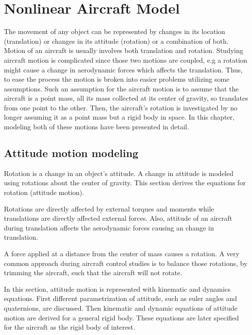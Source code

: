 \chapter{Nonlinear Aircraft Model}

The movement of any object can be represented by changes in its location (translation) or changes in its attitude (rotation) or a combination of both. 
Motion of an aircraft is usually involves both translation and rotation. 
Studying aircraft motion is complicated since those two motions are coupled, e.g a rotation might cause a change in aerodynamic forces which affects the translation. 
Thus, to ease the process the motion is broken into easier problems utilizing some assumptions. 
Such an assumption for the aircraft motion is to assume that the aircraft is a point mass, all its mass collected at its center of gravity, so translates from one point to the other. 
Then, the aircraft's rotation is investigated by no longer assuming it as a point mass but a rigid body in space.
In this chapter, modeling both of these motions have been presented in detail.
  
\section{Attitude motion modeling}

Rotation is a change in an object's attitude. 
A change in attitude is modeled using rotations about the center of gravity.  
This section derives the equations for rotation (attitude motion).

Rotations are directly affected by external torques and moments while translations are directly affected external forces. 
Also, attitude of an aircraft during translation affects the aerodynamic forces causing an change in translation.

A force applied at a distance from the center of mass causes a rotation.
A very common approach during aircraft control studies is to balance those rotations, by trimming the aircraft, such that the aircraft will not rotate.

In this section, attitude motion is represented with kinematic and dynamics equations. 
First different parametrization of attitude, such as euler angles and quaternions, are discussed. 
Then kinematic and dynamic equations of attitude motion are derived for a general rigid body. 
These equations are later specified for the aircraft as the rigid body of interest. 

